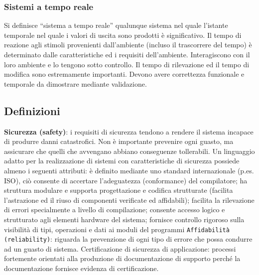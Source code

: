\subsubsection{Sistemi a tempo reale}
Si definisce ``sistema a tempo reale'' qualunque sistema nel quale l'istante temporale nel quale i valori di uscita sono prodotti è significativo. Il tempo di reazione agli stimoli provenienti dall'ambiente (incluso il trascorrere del tempo) è determinato dalle caratteristiche ed i requisiti dell'ambiente. Interagiscono con il loro ambiente e lo tengono sotto controllo. Il tempo di rilevazione ed il tempo di modifica sono estremamente importanti. Devono avere correttezza funzionale e temporale da dimostrare mediante validazione.

\subsection{Definizioni}
\textbf{Sicurezza (safety)}: i requisiti di sicurezza tendono a rendere il sistema incapace di produrre danni catastrofici. Non è importante prevenire ogni guasto, ma assicurare che quelli che avvengano abbiano conseguenze tollerabili. Un linguaggio adatto per la realizzazione di sistemi con caratteristiche di sicurezza possiede almeno i seguenti attributi: è definito mediante uno standard internazionale (p.es. ISO), ciò consente di accertare l'adeguatezza (conformance) del compilatore; ha struttura modulare e supporta progettazione e codifica strutturate (facilita l'astrazione ed il riuso di componenti verificate ed affidabili); facilita la rilevazione di errori specialmente a livello di compilazione; consente accesso logico e strutturato agli elementi hardware del sistema; fornisce controllo rigoroso sulla visibilità di tipi, operazioni e dati ai moduli del programmi
\texttt{Affidabilità (reliability)}: riguarda la prevenzione di ogni tipo di errore che possa condurre ad un guasto di sistema. Certificazione di sicurezza di applicazione: processi fortemente orientati alla produzione di documentazione di supporto perché la documentazione fornisce evidenza di certificazione.